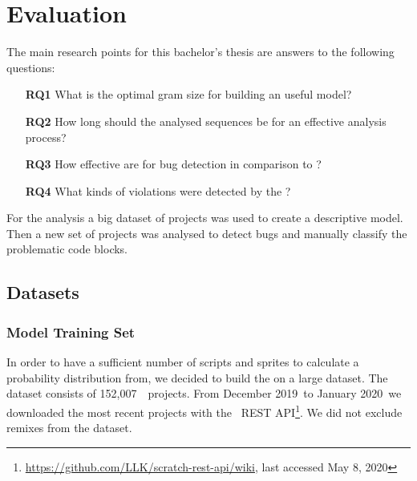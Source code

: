 
\newcommand{\numlarge}{152,007}
\newcommand{\monthstart}{December 2019}
\newcommand{\monthend}{January 2020}
\newcommand{\parsingexcp}{114}
\newcommand{\successfullyanalysed}{151,893}
\newcommand{\foundbugs}{100}
\newcommand{\modelduration}{72 h}
\newcommand{\bugfindingduration}{5 min}

\chapter{Evaluation}\label{chap:evaluation}

The main research points for this bachelor's thesis are answers to the following questions:
\begin{itemize}
\item[\textbf{RQ1}] What is the optimal gram size for building an useful model?
\item[\textbf{RQ2}] How long should the analysed sequences be for an effective analysis process?
\item[\textbf{RQ3}] How effective are  for bug detection in comparison to \litterbox{}?
\item[\textbf{RQ4}] What kinds of violations were detected by the \ngram{}?
\end{itemize}
For the analysis a big dataset of  projects was used to create a descriptive model. Then a new set of projects was analysed to detect bugs and manually classify the problematic code blocks.


\section{Datasets}\label{sec:dataset}

\subsection{Model Training Set}\label{subsec:trainingset}
In order to have a sufficient number of scripts and sprites to calculate a probability distribution from, we decided to build the \ngram{} on a large dataset. The dataset consists of \numlarge\ \scratch\ projects. From \monthstart\ to \monthend\ we downloaded the most recent projects with the \scratch\ REST API\footnote{\url{https://github.com/LLK/scratch-rest-api/wiki}, last accessed May 8, 2020}. We did not exclude remixes from the dataset.

